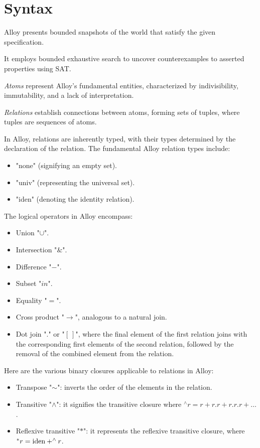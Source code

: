\section{Syntax}

Alloy presents bounded snapshots of the world that satisfy the given specification. 

It employs bounded exhaustive search to uncover counterexamples to asserted properties using SAT.        
\newpage
\begin{definition}
        \emph{Atoms} represent Alloy's fundamental entities, characterized by indivisibility, immutability, and a lack of interpretation.

        \emph{Relations} establish connections between atoms, forming sets of tuples, where tuples are sequences of atoms.
    \end{definition}
    In Alloy, relations are inherently typed, with their types determined by the declaration of the relation. 
    The fundamental Alloy relation types include:
    \begin{itemize}
        \item "none" (signifying an empty set). 
        \item "univ" (representing the universal set).
        \item "iden" (denoting the identity relation).
    \end{itemize}
    The logical operators in Alloy encompass:
    \begin{itemize}
        \item Union "$\cup$".
        \item Intersection "$\&$".
        \item Difference "$-$".
        \item Subset "$in$".
        \item Equality "$=$".
        \item Cross product "$\rightarrow$", analogous to a natural join.
        \item Dot join "$.$" or "$[\:]$", where the final element of the first relation joins with the corresponding first elements of the second relation, followed by the removal of the combined element from the relation.
    \end{itemize}
    Here are the various binary closures applicable to relations in Alloy:
    \begin{itemize}
        \item Transpose "$\sim$": inverts the order of the elements in the relation.
        \item Transitive "$\land$": it signifies the transitive closure where $^{\land}r=r+r.r+r.r.r+\dots$. 
        \item Reflexive transitive "$*$": it represents the reflexive transitive closure, where $^{*}r=\textnormal{iden}+^{\land}r$. 
    \end{itemize}
